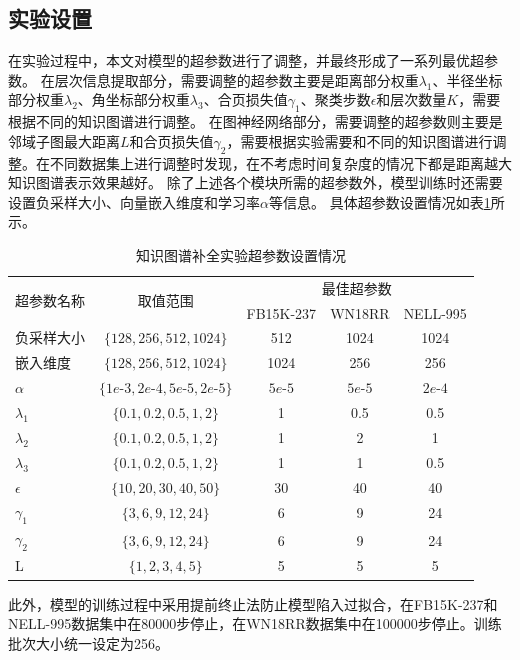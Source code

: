\documentclass[algorithmlist, AutoFakeBold, AutoFakeSlant, figurelist, tablelist, nomlist, engineering]{seuthesix}
\begin{document}
\subsection{实验设置}
在实验过程中，本文对模型的超参数进行了调整，并最终形成了一系列最优超参数。
在层次信息提取部分，需要调整的超参数主要是距离部分权重$\lambda_1$、半径坐标部分权重$\lambda_2$、角坐标部分权重$\lambda_3$、合页损失值$\gamma_1$、聚类步数$\epsilon$和层次数量$K$，需要根据不同的知识图谱进行调整。
在图神经网络部分，需要调整的超参数则主要是邻域子图最大距离$L$和合页损失值$\gamma_2$，需要根据实验需要和不同的知识图谱进行调整。在不同数据集上进行调整时发现，在不考虑时间复杂度的情况下都是距离越大知识图谱表示效果越好。
除了上述各个模块所需的超参数外，模型训练时还需要设置负采样大小、向量嵌入维度和学习率$\alpha$等信息。
具体超参数设置情况如表\ref{Hyperparameters1}所示。
\begin{table}[]
  \centering
  \begin{tabular*}{0.95\textwidth}{@{\extracolsep{\fill}}lcccc}
  \toprule[1pt]
  \multirow{2}{*}{超参数名称} & \multirow{2}{*}{取值范围} & \multicolumn{3}{c}{最佳超参数}\\ 
    & & FB15K-237 & WN18RR & NELL-995 \\ \hline
  负采样大小 & $\{128, 256, 512, 1024\}$ & 512 & 1024 & 1024 \\
  嵌入维度 & $\{128, 256, 512, 1024\}$ & 1024 & 256 & 256 \\
  $\alpha$ & $\{1e\text{-}3, 2e\text{-}4, 5e\text{-}5, 2e\text{-}5\}$ & $5e\text{-}5$ & $5e\text{-}5$ & $2e\text{-}4$ \\
  $\lambda_1$ & $\{0.1, 0.2, 0.5, 1, 2\}$ & 1 & 0.5 & 0.5 \\
  $\lambda_2$ & $\{0.1, 0.2, 0.5, 1, 2\}$ & 1 & 2 & 1 \\
  $\lambda_3$ & $\{0.1, 0.2, 0.5, 1, 2\}$ & 1 & 1 & 0.5 \\
  $\epsilon$ & $\{10, 20, 30, 40, 50\}$ & 30 & 40 & 40 \\
  $\gamma_1$ & $\{3, 6, 9, 12, 24\}$ & 6 & 9 & 24 \\
  $\gamma_2$ & $\{3, 6, 9, 12, 24\}$ & 6 & 9 & 24 \\
  L & $\{1, 2, 3, 4, 5\}$ & 5 & 5 & 5 \\
  \bottomrule[1pt]
  \end{tabular*}
  \caption{知识图谱补全实验超参数设置情况}
  \label{Hyperparameters1}
\end{table}
此外，模型的训练过程中采用提前终止法防止模型陷入过拟合，在FB15K-237和NELL-995数据集中在80000步停止，在WN18RR数据集中在100000步停止。训练批次大小统一设定为256。
\end{document}
